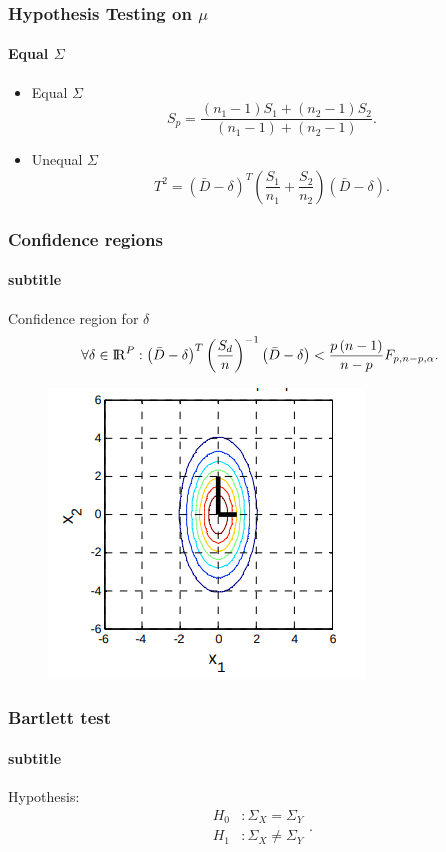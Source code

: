 \documentclass[aspectratio=169,10pt,t]{beamer}
\begin{document}
\begin{frame}[t]
	\frametitle{Hypothesis Testing on $\mu$}
	\framesubtitle{Equal $\Sigma$}
	\begin{itemize}
		\item Equal $\Sigma$\\
			\[
			S_p = 
			\frac{  \left( n_1 -1  \right) S_1 +  \left( n_2 -1  \right) S_2}
			{ \left( n_1 -1  \right) +  \left( n_2 -1  \right) } 
			.\] 
		\item Unequal $\Sigma$
			\[
			T^{2} =
			\left( \bar{D} - \delta  \right) ^{T}
			\left( \frac{S_1}{n_1} + \frac{S_2}{n_2}  \right) 
			\left( \bar{D} - \delta  \right)
			.\] 
	\end{itemize}
\end{frame}
\begin{frame}[t]
	\frametitle{Confidence regions}
	\framesubtitle{subtitle}
	Confidence region for $\delta$
	\[
		\forall \delta \in {\rm I\!R}^{P}:
		\left( \bar{D} - \delta  \right) ^{T}
		\left( \frac{S_d}{n}  \right) ^{-1}
		\left( \bar{D} - \delta  \right)
		<
		\frac{p  \left( n-1 \right) }{n-p} 
		F_{p,n-p,\alpha}
	.\] 
	\begin{figure}[h]
		\centering
		\includegraphics[width=0.35\linewidth]{../01/images/1.png}
	\end{figure}
\end{frame}

\begin{frame}[t]
	\frametitle{Bartlett test}
	\framesubtitle{subtitle}
	Hypothesis:
	\[
		\begin{aligned}
			H_0 &: \Sigma_X = \Sigma_Y\\
			H_1 &: \Sigma_X \neq \Sigma_Y
		\end{aligned}
	.\] 
\end{frame}
\end{document}
